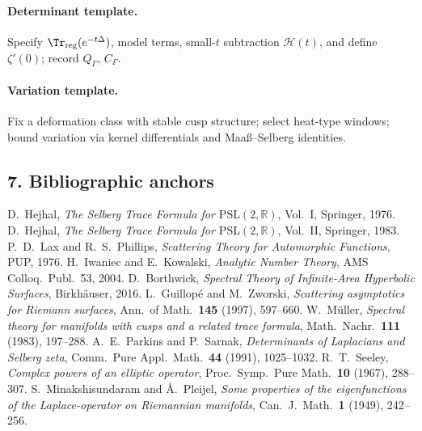 \paragraph{Determinant template.}
Specify $\Tr_{\mathrm{reg}}(e^{-t\Delta})$, model terms, small-$t$ subtraction $\mathcal{H}(t)$, and define $\zeta'(0)$; record $Q_\Gamma$, $C_\Gamma$. \relax\hspace{0pt}

\paragraph{Variation template.}
Fix a deformation class with stable cusp structure; select heat-type windows; bound variation via kernel differentials and Maa\ss--Selberg identities. \relax\hspace{0pt}

\subsection*{7. Bibliographic anchors}\relax\hspace{0pt}
\label{subsec:tfc8-refs} %

\begin{thebibliography}{99} %
 D.~Hejhal, \emph{The Selberg Trace Formula for $\mathrm{PSL}(2,\mathbb{R})$}, Vol.~I, Springer, 1976. %
 D.~Hejhal, \emph{The Selberg Trace Formula for $\mathrm{PSL}(2,\mathbb{R})$}, Vol.~II, Springer, 1983. %
 P.~D.~Lax and R.~S.~Phillips, \emph{Scattering Theory for Automorphic Functions}, PUP, 1976. %
 H.~Iwaniec and E.~Kowalski, \emph{Analytic Number Theory}, AMS Colloq.\ Publ.\ 53, 2004. %
 D.~Borthwick, \emph{Spectral Theory of Infinite-Area Hyperbolic Surfaces}, Birkh\"auser, 2016. %
 L.~Guillop\'e and M.~Zworski, \emph{Scattering asymptotics for Riemann surfaces}, Ann.\ of Math.\ \textbf{145} (1997), 597--660. %
 W.~M\"uller, \emph{Spectral theory for manifolds with cusps and a related trace formula}, Math.\ Nachr.\ \textbf{111} (1983), 197--288. %
 A.~E.~Parkins and P.~Sarnak, \emph{Determinants of Laplacians and Selberg zeta}, Comm.\ Pure Appl.\ Math.\ \textbf{44} (1991), 1025--1032. %
 R.~T.~Seeley, \emph{Complex powers of an elliptic operator}, Proc.\ Symp.\ Pure Math.\ \textbf{10} (1967), 288--307. %
 S.~Minakshisundaram and \AA.~Pleijel, \emph{Some properties of the eigenfunctions of the Laplace-operator on Riemannian manifolds}, Can.\ J.\ Math.\ \textbf{1} (1949), 242--256. %
\end{thebibliography}

